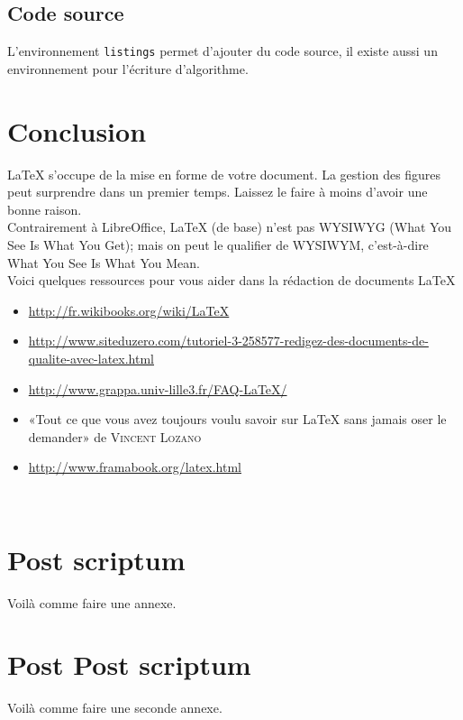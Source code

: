 \documentclass[a4paper]{article}
\begin{document}
		\subsection{Code source}

			L'environnement \texttt{listings} permet d'ajouter du code source, il existe aussi un environnement pour l'écriture d'algorithme. \\

			


	\section*{Conclusion}

		\LaTeX{} s'occupe de la mise en forme de votre document. La gestion des figures peut surprendre dans un premier temps. Laissez le faire à moins d'avoir une bonne raison. \\

		Contrairement à LibreOffice, \LaTeX{} (de base) n'est pas WYSIWYG (What You See Is What You Get); mais on peut le qualifier de WYSIWYM, c'est-à-dire What You See Is What You Mean. \\

		\noindent Voici quelques ressources pour vous aider dans la rédaction de documents \LaTeX{}
		\begin{itemize}
			\item \url{http://fr.wikibooks.org/wiki/LaTeX}
			\item \url{http://www.siteduzero.com/tutoriel-3-258577-redigez-des-documents-de-qualite-avec-latex.html}
			\item \url{http://www.grappa.univ-lille3.fr/FAQ-LaTeX/}
			\item «Tout ce que vous avez toujours voulu savoir sur LaTeX sans jamais oser le demander» de \textsc{Vincent Lozano}
			\item[] \url{http://www.framabook.org/latex.html}
		\end{itemize} ~

		
	\appendix

	\section{Post scriptum}

		Voilà comme faire une annexe. \\

	\section{Post Post scriptum}

		Voilà comme faire une seconde annexe. \\


	\listoffigures
\end{document}
